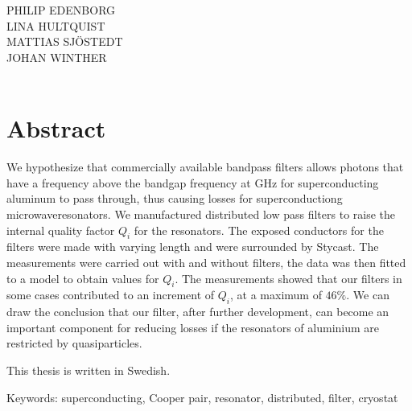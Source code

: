 \documentclass[../../main.tex]{subfiles}
\begin{document}
\titel\\
\undertitel\\
PHILIP EDENBORG\\LINA HULTQUIST\\MATTIAS SJÖSTEDT\\JOHAN WINTHER\\
\department\\
\university \setlength{\parskip}{0.5cm}

\thispagestyle{plain}			%
\setlength{\parskip}{0pt plus 1.0pt}
\section*{Abstract}



We hypothesize that commercially available bandpass filters allows photons that have a frequency above the bandgap frequency at \unit[88]{GHz} for superconducting aluminum to pass through, thus causing losses for superconductiong microwaveresonators. We manufactured distributed low pass filters to raise the internal quality factor $Q_i$ for the resonators. The exposed conductors for the filters were made with varying length and were surrounded by Stycast. The measurements were carried out with and without filters, the data was then fitted to a model to obtain values for $Q_i$. The measurements showed that our filters in some cases contributed to an increment of $Q_i$, at a maximum of $46 \%$. We can draw the conclusion that our filter, after further development, can become an important component for reducing losses if the resonators of aluminium are restricted by quasiparticles.



This thesis is written in Swedish.

\vfill
Keywords: superconducting, Cooper pair, resonator, distributed, filter, cryostat
\end{document}
